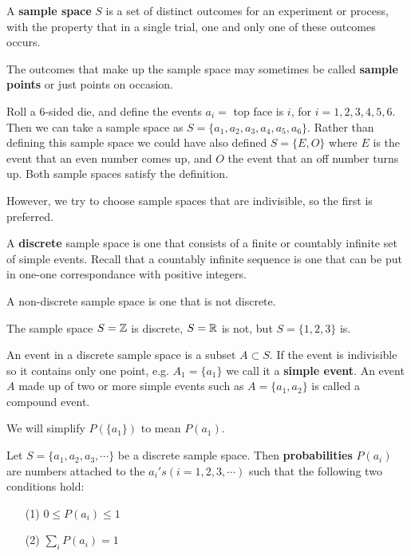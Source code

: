 \documentclass[english, 11pt]{article}
\begin{document}
  \begin{defn}\label{sample space}
    A \textbf{sample space} $S$ is a set of distinct outcomes for an experiment or process, with the property that in a single trial, one and only one of these outcomes occurs.
  \end{defn}

  The outcomes that make up the sample space may sometimes be called \textbf{sample points} or just points on occasion.

  \begin{exmp}
    Roll a 6-sided die, and define the events $a_i = $ top face is $i$, for $i = 1,2,3,4,5,6$. Then we can take a sample space as $S = \{ a_1, a_2, a_3, a_4, a_5, a_6\}$. Rather than defining this sample space we could have also defined $S = \{ E, O \}$ where $E$ is the event that an even number comes up, and $O$ the event that an off number turns up. Both sample spaces satisfy the definition.
  \end{exmp}

  However, we try to choose sample spaces that are indivisible, so the first is preferred.

  \begin{defn}
    A \textbf{discrete} sample space is one that consists of a finite or countably infinite set of simple events. Recall that a countably infinite sequence is one that can be put in one-one correspondance with positive integers.
  \end{defn}

  \begin{defn}
    A non-discrete sample space is one that is not discrete.
  \end{defn}

  \begin{exmp}
    The sample space $S = {\mathbb{Z}}$ is discrete, $S = {\mathbb{R}}$ is not, but $S = \{ 1, 2, 3 \}$ is.
  \end{exmp}

  \begin{defn}
    An event in a discrete sample space is a subset $A \subset S$. If the event is indivisible so it contains only one point, e.g. $A_1 = \{a_1\}$ we call it a \textbf{simple event}. An event $A$ made up of two or more simple events such as $A = \{a_1, a_2 \}$ is called a compound event.
  \end{defn}

  We will simplify $P(\{a_1\})$ to mean $P(a_1)$.

  \begin{defn}
    Let $S = \{a_1, a_2, a_3, \cdots\}$ be a discrete sample space. Then \textbf{probabilities} $P(a_i)$ are numbers attached to the $a_i's (i = 1,2,3,\cdots)$ such that the following two conditions hold:
    \begin{itemize}
      \item[(1)] $0 \leq P(a_i) \leq 1$
      \item[(2)] $\sum_i P(a_i) = 1$
    \end{itemize}
  \end{defn}
\end{document}
